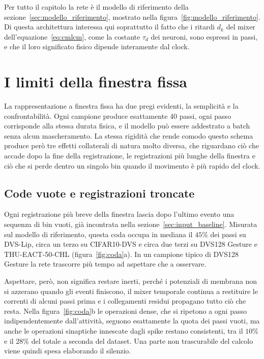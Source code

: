 Per tutto il capitolo la rete è il modello di riferimento della sezione~\ref{sec:modello_riferimento}, mostrato nella figura~\ref{fig:modello_riferimento}. Di questa architettura interessa qui soprattutto il fatto che i ritardi $d_k$ del mixer dell'equazione~\eqref{eq:cmlcm}, come la costante $\tau_d$ dei neuroni, sono espressi in passi, e che il loro significato fisico dipende interamente dal clock.



\section{I limiti della finestra fissa}
\label{sec:limiti_finestra_fissa}

La rappresentazione a finestra fissa ha due pregi evidenti, la semplicità e la confrontabilità. Ogni campione produce esattamente 40 passi, ogni passo corrisponde alla stessa durata fisica, e il modello può essere addestrato a batch senza alcun mascheramento. La stessa rigidità che rende comodo questo schema produce però tre effetti collaterali di natura molto diversa, che riguardano ciò che accade dopo la fine della registrazione, le registrazioni più lunghe della finestra e ciò che si perde dentro un singolo bin quando il movimento è più rapido del clock.

\subsection{Code vuote e registrazioni troncate}
\label{subsec:coda_vuota}

Ogni registrazione più breve della finestra lascia dopo l'ultimo evento una sequenza di bin vuoti, già incontrata nella sezione~\ref{sec:input_baseline}. Misurata sul modello di riferimento, questa coda occupa in mediana il $45\%$ dei passi su DVS-Lip, circa un terzo su CIFAR10-DVS e circa due terzi su DVS128 Gesture e THU-EACT-50-CHL (figura~\ref{fig:coda}a). In un campione tipico di DVS128 Gesture la rete trascorre più tempo ad aspettare che a osservare.

Aspettare, però, non significa restare inerti, perché i potenziali di membrana non si azzerano quando gli eventi finiscono, il mixer temporale continua a restituire le correnti di alcuni passi prima e i collegamenti residui propagano tutto ciò che resta. Nella figura~\ref{fig:coda}b le operazioni dense, che si ripetono a ogni passo indipendentemente dall'attività, seguono esattamente la quota dei passi vuoti, ma anche le operazioni sinaptiche innescate dagli spike restano consistenti, tra il $10\%$ e il $28\%$ del totale a seconda del dataset. Una parte non trascurabile del calcolo viene quindi spesa elaborando il silenzio.

